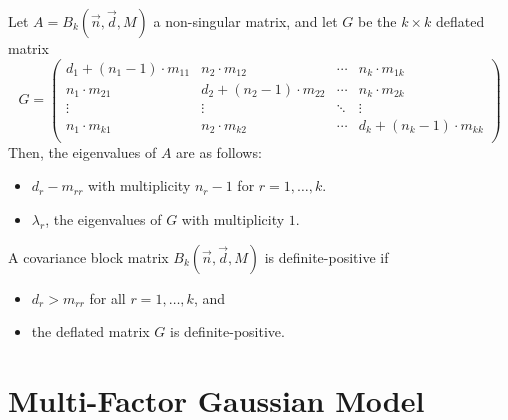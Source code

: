 \documentclass[11pt,fleqn]{book} %
\begin{document}
\begin{proposition}
	\label{prop1}
	Let $A = B_k(\vec{n}, \vec{d}, M)$ a non-singular matrix, and let $G$ be 
	the $k {\times} k$ deflated matrix
	\begin{displaymath}
		G =
		\left( \begin{array}{cccc}
		d_1+(n_1-1)\cdot m_{11} & n_2 \cdot m_{12}        & \cdots & n_k \cdot m_{1k} \\
		n_1\cdot m_{21}         & d_2+(n_2-1)\cdot m_{22} & \cdots & n_k \cdot m_{2k} \\
		\vdots                  & \vdots                  & \ddots & \vdots \\
		n_1\cdot m_{k1}         & n_2 \cdot m_{k2}        & \cdots & d_k+(n_k-1)\cdot m_{kk} \\
		\end{array} \right)
	\end{displaymath}
	Then, the eigenvalues of $A$ are as follows:
	\begin{itemize}
		\item $d_{r}-m_{rr}$ with multiplicity $n_r-1$ for $r=1,\dots,k$.
		\item $\lambda_r$, the eigenvalues of $G$ with multiplicity $1$.
	\end{itemize}
\end{proposition}

\begin{corollary}
	A covariance block matrix $B_k(\vec{n},\vec{d},M)$ is definite-positive if
	\begin{itemize}
		\item $d_r > m_{rr}$ for all $r=1,\dots,k$, and
		\item the deflated matrix $G$ is definite-positive.
	\end{itemize}
\end{corollary}

\section{Multi-Factor Gaussian Model}
\label{ap:mfgm}
\end{document}

